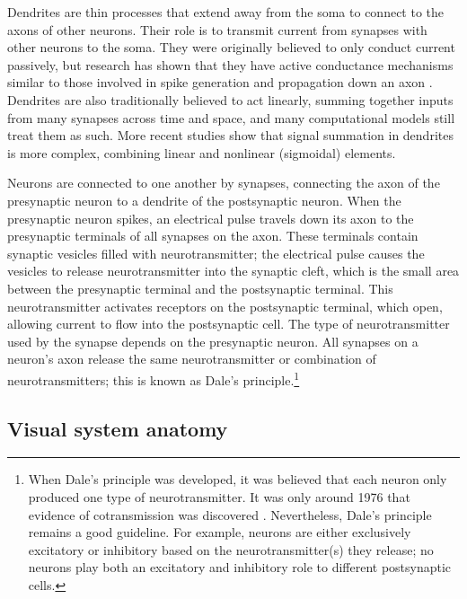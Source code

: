 Dendrites are thin processes that extend away from the soma
to connect to the axons of other neurons.
Their role is to transmit current from synapses with other neurons to the soma.
They were originally believed to only conduct current passively,
but research has shown that they have active conductance mechanisms
similar to those involved in spike generation and propagation down an axon
\parencite{Mel1994,Johnston1996}.
Dendrites are also traditionally believed to act linearly,
summing together inputs from many synapses across time and space,
and many computational models still treat them as such.
More recent studies \parencite[\eg/][]{Polsky2004} show that signal summation
in dendrites is more complex,
combining linear and nonlinear (sigmoidal) elements.

Neurons are connected to one another by synapses,
connecting the axon of the presynaptic neuron
to a dendrite of the postsynaptic neuron.
When the presynaptic neuron spikes,
an electrical pulse travels down its axon to the presynaptic terminals
of all synapses on the axon.
These terminals contain synaptic vesicles filled with neurotransmitter;
the electrical pulse causes the vesicles to release neurotransmitter
into the synaptic cleft,
which is the small area between the presynaptic terminal
and the postsynaptic terminal.
This neurotransmitter activates receptors on the postsynaptic terminal,
which open, allowing current to flow into the postsynaptic cell.
The type of neurotransmitter used by the synapse depends on the presynaptic neuron.
All synapses on a neuron's axon release the same neurotransmitter
or combination of neurotransmitters; this is known as Dale's principle.\footnote{
  When Dale's principle was developed,
  it was believed that each neuron only produced
  one type of neurotransmitter.
  It was only around 1976 that evidence of cotransmission was discovered
  \parencite{Burnstock2004}.
  Nevertheless, Dale's principle remains a good guideline.
  For example, neurons are either exclusively excitatory or inhibitory
  based on the neurotransmitter(s) they release;
  no neurons play both an excitatory and inhibitory role
  to different postsynaptic cells.}


\subsection{Visual system anatomy}


